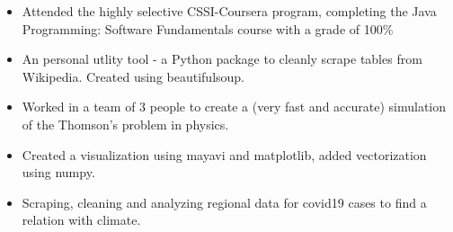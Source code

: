 \documentclass[a4paper]{resume}
\begin{document}
\begin{itemize} \vspace{-5pt} \itemsep -2pt
	\item Attended the highly selective CSSI-Coursera program, completing the Java Programming: Software Fundamentals course with a grade of 100\%
\end{itemize}



\begin{itemize} \vspace{-5pt} \itemsep -2pt
	\item An personal utlity tool - a Python package to cleanly scrape tables from Wikipedia. Created using beautifulsoup.
\end{itemize}

\begin{itemize} \vspace{-5pt} \itemsep -2pt
	\item Worked in a team of 3 people to create a (very fast and accurate) simulation of the Thomson's problem in physics.
	\item Created a visualization using mayavi and matplotlib, added vectorization using numpy.
\end{itemize}

\begin{itemize} \vspace{-5pt} \itemsep -2pt
	\item Scraping, cleaning and analyzing regional data for covid19 cases to find a relation with climate.
\end{itemize}

\enresection
\end{document}
